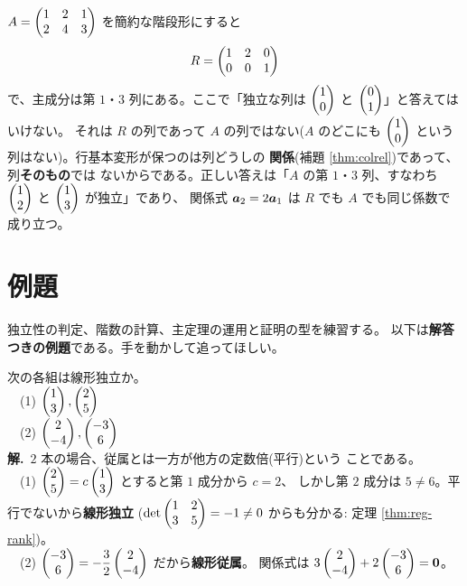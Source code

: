 \begin{hanrei}\label{hanrei:rref-cols}
$A = \begin{pmatrix}1 & 2 & 1 \\ 2 & 4 & 3\end{pmatrix}$ を簡約な階段形にすると
\[
R = \begin{pmatrix}1 & 2 & 0 \\ 0 & 0 & 1\end{pmatrix}
\]
で、主成分は第 $1$・$3$ 列にある。ここで「独立な列は
$\begin{pmatrix}1 \\ 0\end{pmatrix}$ と $\begin{pmatrix}0 \\ 1\end{pmatrix}$」と答えてはいけない。
それは $R$ の列であって $A$ の列ではない($A$ のどこにも
$\begin{pmatrix}1 \\ 0\end{pmatrix}$ という列はない)。行基本変形が保つのは列どうしの
\textbf{関係}(補題 \ref{thm:colrel})であって、列\textbf{そのもの}では
ないからである。正しい答えは「$A$ の第 $1$・$3$ 列、すなわち
$\begin{pmatrix}1 \\ 2\end{pmatrix}$ と $\begin{pmatrix}1 \\ 3\end{pmatrix}$ が独立」であり、
関係式 $\bm{a}_2 = 2\bm{a}_1$ は $R$ でも $A$ でも同じ係数で成り立つ。
\end{hanrei}

\section{例題}

独立性の判定、階数の計算、主定理の運用と証明の型を練習する。
以下は\textbf{解答つきの例題}である。手を動かして追ってほしい。

\begin{rei}[例題・基本($2$ 本の判定)]\label{rei:rank-two}
次の各組は線形独立か。\\
　(1) $\begin{pmatrix}1 \\ 3\end{pmatrix}, \begin{pmatrix}2 \\ 5\end{pmatrix}$\\
　(2) $\begin{pmatrix}2 \\ -4\end{pmatrix}, \begin{pmatrix}-3 \\ 6\end{pmatrix}$\\
\textbf{解.}\ $2$ 本の場合、従属とは一方が他方の定数倍(平行)という
ことである。\\
　(1) $\begin{pmatrix}2 \\ 5\end{pmatrix} = c\begin{pmatrix}1 \\ 3\end{pmatrix}$ とすると第 $1$ 成分から $c = 2$、
しかし第 $2$ 成分は $5 \neq 6$。平行でないから\textbf{線形独立}
($\det \begin{pmatrix}1 & 2 \\ 3 & 5\end{pmatrix} = -1 \neq 0$ からも分かる:
定理 \ref{thm:reg-rank})。\\
　(2) $\begin{pmatrix}-3 \\ 6\end{pmatrix} = -\dfrac{3}{2}\begin{pmatrix}2 \\ -4\end{pmatrix}$ だから\textbf{線形従属}。
関係式は $3\begin{pmatrix}2 \\ -4\end{pmatrix} + 2\begin{pmatrix}-3 \\ 6\end{pmatrix} = \bm{0}$。
\end{rei}

